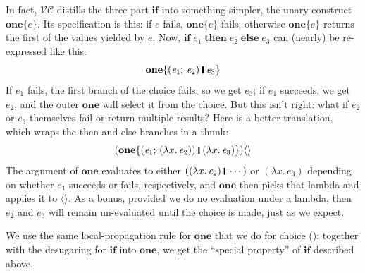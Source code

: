 \documentclass[acmsmall,review,dvipsnames]{acmart}
\newcommand{\Varid}[1]{\mathit{#1}}
\newcommand{\versecalc}{$\mathcal{VC}$}
\begin{document}
In fact, \versecalc{} distills the three-part \ensuremath{\textbf{if}} into something simpler, the unary construct \ensuremath{\textbf{one}\{\Varid{e}\}}.
Its specification is this:
if \ensuremath{\Varid{e}} fails, \ensuremath{\textbf{one}\{\Varid{e}\}} fails; otherwise \ensuremath{\textbf{one}\{\Varid{e}\}} returns the first of the values yielded by \ensuremath{\Varid{e}}.
Now, \ensuremath{\textbf{if}\;\Varid{e}_{\mathrm{1}}\;\textbf{then}\;\Varid{e}_{\mathrm{2}}\;\textbf{else}\;\Varid{e}_{\mathrm{3}}} can (nearly) be re-expressed like this:
$$
\ensuremath{\textbf{one}\{(\Varid{e}_{\mathrm{1}};\,\Varid{e}_{\mathrm{2}})\;\rule[-0.3mm]{0.5mm}{2.5mm}\;\Varid{e}_{\mathrm{3}}\}}
$$
If \ensuremath{\Varid{e}_{\mathrm{1}}} fails, the first branch of the choice fails, so we get \ensuremath{\Varid{e}_{\mathrm{3}}}; if \ensuremath{\Varid{e}_{\mathrm{1}}} succeeds, we
get \ensuremath{\Varid{e}_{\mathrm{2}}}, and the outer \ensuremath{\textbf{one}} will select it from the choice.  But this isn't right:
what if \ensuremath{\Varid{e}_{\mathrm{2}}} or \ensuremath{\Varid{e}_{\mathrm{3}}} themselves fail or return multiple results?  Here is a better translation,
which wraps the then and else branches in a thunk:
$$
\ensuremath{(\textbf{one}\{(\Varid{e}_{\mathrm{1}};\,(\lambda x.\,\Varid{e}_{\mathrm{2}}))\;\rule[-0.3mm]{0.5mm}{2.5mm}\;(\lambda x.\,\Varid{e}_{\mathrm{3}})\})\langle\rangle}
$$
The argument of \ensuremath{\textbf{one}} evaluates to either \ensuremath{((\lambda x.\,\Varid{e}_{\mathrm{2}})\;\rule[-0.3mm]{0.5mm}{2.5mm}\;\cdots)} or \ensuremath{(\lambda x.\,\Varid{e}_{\mathrm{3}})}
depending on whether \ensuremath{\Varid{e}_{\mathrm{1}}} succeeds or fails, respectively, and \ensuremath{\textbf{one}} then picks that lambda and applies it to \ensuremath{\langle\rangle}.
As a bonus, provided we do no evaluation under a lambda, then \ensuremath{\Varid{e}_{\mathrm{2}}} and \ensuremath{\Varid{e}_{\mathrm{3}}} will
remain un-evaluated until the choice is made, just as we expect.

We use the same local-propagation rule for \ensuremath{\textbf{one}} that we do for choice ();
together with the desugaring for \ensuremath{\textbf{if}} into \ensuremath{\textbf{one}},
we get the ``special property'' of \ensuremath{\textbf{if}} described above.
\end{document}

